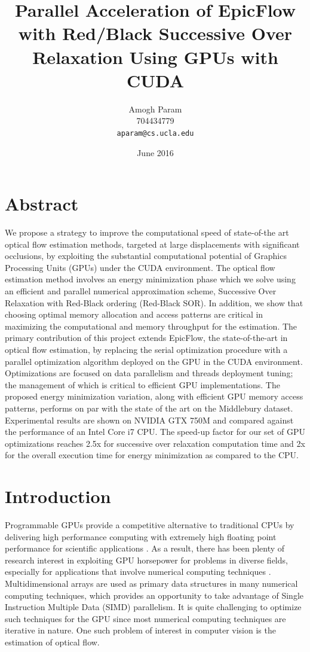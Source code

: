\documentclass[english]{article}
\title{Parallel Acceleration of EpicFlow with Red/Black Successive Over Relaxation Using GPUs with CUDA}
\author{
  Amogh Param\\
  704434779\\
  \texttt{aparam@cs.ucla.edu}
}
\date{June 2016}
\begin{document}
    \maketitle
     
	\section*{Abstract}  
	We propose a strategy to improve the computational speed of state-of-the art optical flow estimation methods, targeted at large displacements with significant occlusions, by exploiting the substantial computational potential of Graphics Processing Units (GPUs) under the CUDA environment. The optical flow estimation method involves an energy minimization phase which we solve using an efficient and parallel numerical approximation scheme, Successive Over Relaxation with Red-Black ordering (Red-Black SOR). In addition, we show that choosing optimal memory allocation and access patterns are critical in maximizing the computational and memory throughput for the estimation. The primary contribution of this project extends  EpicFlow\cite{1}, the state-of-the-art in optical flow estimation, by replacing the serial optimization procedure with a parallel optimization algorithm deployed on the GPU in the CUDA environment. Optimizations are focused on data parallelism and threads deployment tuning; the management of which is critical to efficient GPU implementations. The proposed energy minimization variation, along with efficient GPU memory access patterns, performs on par with the state of the art on the Middlebury dataset. Experimental results are shown on NVIDIA GTX 750M and compared against the performance of an Intel Core i7 CPU. The speed-up factor for our set of GPU optimizations reaches 2.5x for successive over relaxation computation time and 2x for the overall execution time for energy minimization as compared to the CPU.

    \section{Introduction}
	Programmable GPUs provide a competitive alternative to traditional CPUs by delivering high performance computing with extremely high floating point performance for scientific applications \cite{6}. As a result, there has been plenty of research interest in exploiting GPU horsepower for problems in diverse fields, especially for applications that involve numerical computing techniques \cite{7}. Multidimensional arrays are used as primary data structures in many numerical computing techniques, which provides an opportunity to take advantage of Single Instruction Multiple Data (SIMD) parallelism. It is quite challenging to optimize such techniques for the GPU since most numerical computing techniques are iterative in nature. One such problem of interest in computer vision is the estimation of optical flow.\newline
\end{document}

